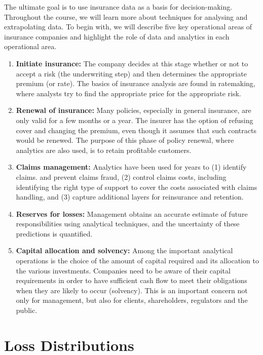 \documentclass[landscape, 20pt]{extreport}
\theoremstyle{definition}
\theoremstyle{definition}
\theoremstyle{definition}
\theoremstyle{definition}
\theoremstyle{remark}
\begin{document}
The ultimate goal is to use insurance data as a basis for decision-making. Throughout the course, we will learn more about techniques for analysing and extrapolating data. To begin with, we will describe five key operational areas of insurance companies and highlight the role of data and analytics in each operational area.

\begin{enumerate}
\def\labelenumi{\arabic{enumi}.}
\item
  \textbf{Initiate insurance:} The company decides at this stage whether or not to accept a risk (the underwriting step) and then determines the appropriate premium (or rate). The basics of insurance analysis are found in ratemaking, where analysts try to find the appropriate price for the appropriate risk.
\item
  \textbf{Renewal of insurance:} Many policies, especially in general insurance, are only valid for a few months or a year. The insurer has the option of refusing cover and changing the premium, even though it assumes that such contracts would be renewed. The purpose of this phase of policy renewal, where analytics are also used, is to retain profitable customers.
\item
  \textbf{Claims management:} Analytics have been used for years to (1) identify claims.
  and prevent claims fraud, (2) control claims costs, including identifying the right type of support to cover the costs associated with claims handling, and (3) capture additional layers for reinsurance and retention.
\item
  \textbf{Reserves for losses:} Management obtains an accurate estimate of future responsibilities using analytical techniques, and the uncertainty of these predictions is quantified.
\item
  \textbf{Capital allocation and solvency:} Among the important analytical operations is the choice of the amount of capital required and its allocation to the various investments. Companies need to be aware of their capital requirements in order to have sufficient cash flow to meet their obligations when they are likely to occur (solvency). This is an important concern not only for management, but also for clients, shareholders, regulators and the public.
\end{enumerate}

\hypertarget{loss-distributions-1}{%
\section{Loss Distributions}\label{loss-distributions-1}}
\end{document}

